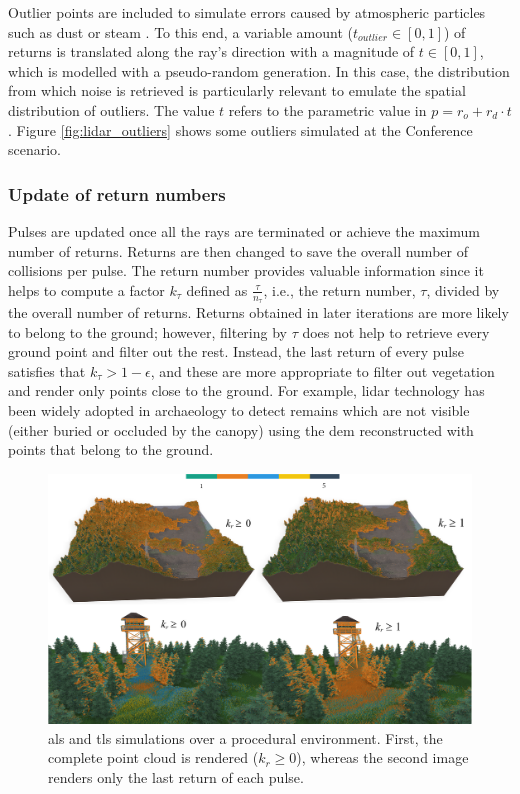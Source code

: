 Outlier points are included to simulate errors caused by atmospheric particles such as dust or steam \cite{boehler_investigating_2018}. To this end, a variable amount ($t_{\textit{outlier}} \in [0, 1]$) of returns is translated along the ray's direction with a magnitude of $t \in [0, 1]$, which is modelled with a pseudo-random generation. In this case, the distribution from which noise is retrieved is particularly relevant to emulate the spatial distribution of outliers. The value $t$ refers to the parametric value in $p = r_o + r_d \cdot t$. Figure \ref{fig:lidar_outliers} shows some outliers simulated at the Conference scenario.

\subsubsection{Update of return numbers}

Pulses are updated once all the rays are terminated or achieve the maximum number of returns. Returns are then changed to save the overall number of collisions per pulse. The return number provides valuable information since it helps to compute a factor $k_{\tau}$ defined as $\frac{\tau}{n_{\tau}}$, i.e., the return number, $\tau$, divided by the overall number of returns. Returns obtained in later iterations are more likely to belong to the ground; however, filtering by $\tau$ does not help to retrieve every ground point and filter out the rest. Instead, the last return of every pulse satisfies that $k_{\tau} > 1 - \epsilon$, and these are more appropriate to filter out vegetation and render only points close to the ground. For example, \acrshort{lidar} technology has been widely adopted in archaeology to detect remains which are not visible (either buried or occluded by the canopy) using the \acrshort{dem} reconstructed with points that belong to the ground. 

\begin{figure}[ht]
	\centering
	\includegraphics[width=1\linewidth]{figs/lidar_simulation/tls_multiple_returns.png}
	\caption{\acrshort{als} and \acrshort{tls} simulations over a procedural environment. First, the complete point cloud is rendered ($k_{r} \geq 0$), whereas the second image renders only the last return of each pulse.}
	\label{fig:multiple_returns}
\end{figure}

